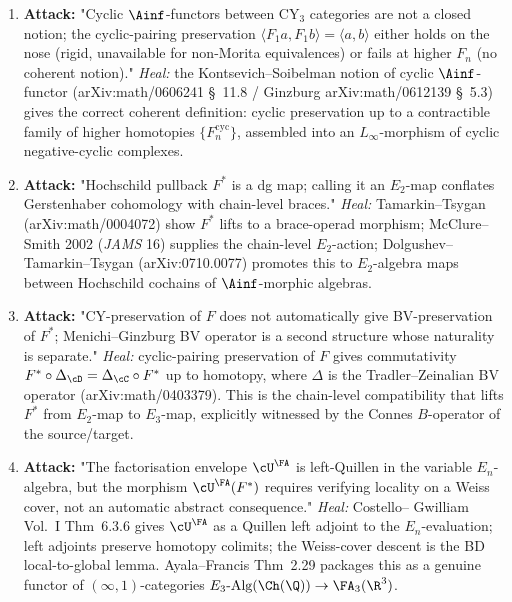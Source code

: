 \begin{enumerate}
\item[(R1)] \textbf{Attack:} "Cyclic $\Ainf$-functors between CY$_3$
     categories are not a closed notion; the cyclic-pairing
     preservation $\langle F_1 a, F_1 b \rangle = \langle a, b \rangle$
     either holds on the nose (rigid, unavailable for non-Morita
     equivalences) or fails at higher $F_n$ (no coherent notion)."
     \emph{Heal:} the Kontsevich--Soibelman notion of cyclic
     $\Ainf$-functor (arXiv:math/0606241 \S~11.8 / Ginzburg
     arXiv:math/0612139 \S~5.3) gives the correct coherent
     definition: cyclic preservation up to a contractible family of
     higher homotopies $\{F_n^{\mathrm{cyc}}\}$, assembled into an
     $L_\infty$-morphism of cyclic negative-cyclic complexes.
\item[(R2)] \textbf{Attack:} "Hochschild pullback $F^*$ is a dg map;
     calling it an $E_2$-map conflates Gerstenhaber cohomology with
     chain-level braces."  \emph{Heal:} Tamarkin--Tsygan
     (arXiv:math/0004072) show $F^*$ lifts to a brace-operad
     morphism; McClure--Smith 2002 (\emph{JAMS} 16) supplies the
     chain-level $E_2$-action; Dolgushev--Tamarkin--Tsygan
     (arXiv:0710.0077) promotes this to $E_2$-algebra maps between
     Hochschild cochains of $\Ainf$-morphic algebras.
\item[(R3)] \textbf{Attack:} "CY-preservation of $F$ does not
     automatically give BV-preservation of $F^*$; Menichi--Ginzburg
     BV operator is a second structure whose naturality is separate."
     \emph{Heal:} cyclic-pairing preservation of $F$ gives
     commutativity $F^* \circ \Delta_\cD = \Delta_\cC \circ F^*$ up to
     homotopy, where $\Delta$ is the Tradler--Zeinalian BV operator
     (arXiv:math/0403379).  This is the chain-level compatibility
     that lifts $F^*$ from $E_2$-map to $E_3$-map, explicitly
     witnessed by the Connes $B$-operator of the source/target.
\item[(R4)] \textbf{Attack:} "The factorisation envelope $\cU^\FA$ is
     left-Quillen in the variable $E_n$-algebra, but the morphism
     $\cU^\FA(F^*)$ requires verifying locality on a Weiss cover, not
     an automatic abstract consequence."  \emph{Heal:} Costello--
     Gwilliam Vol.~I Thm~6.3.6 gives $\cU^\FA$ as a Quillen left
     adjoint to the $E_n$-evaluation; left adjoints preserve
     homotopy colimits; the Weiss-cover descent is the BD
     local-to-global lemma.  Ayala--Francis Thm~2.29 packages this
     as a genuine functor of $(\infty,1)$-categories
     $E_3\text{-Alg}(\Ch(\Q)) \to \FA_3(\R^3)$.

\end{enumerate}
